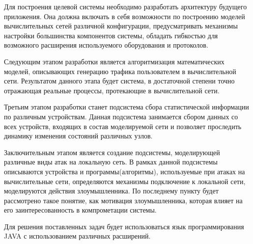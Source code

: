   Для построения целевой системы необходимо разработать архитектуру будущего приложения. Она должна включать в себя возможности по построению моделей вычислительных сетей различной конфигурации, предусматривать механизмы настройки большинства компонентов системы, обладать гибкостью для возможного расширения используемого оборудования и протоколов.

  Следующим этапом разработки является алгоритмизация математических моделей, описывающих генерацию трафика пользователем в вычислительной сети. Результатом данного этапа будет система, в достаточной степени точно отражающая реальные процессы, протекающие в вычислительной сети.

  Третьим этапом разработки станет подсистема сбора статистической информации по различным устройствам. Данная подсистема занимается сбором данных со всех устройств, входящих в состав моделируемой сети и позволяет проследить динамику изменения состояний различных узлов.

  Заключительным этапом является создание подсистемы, моделирующей различные виды атак на локальную сеть. В рамках данной подсистемы описываются устройства и программы(алгоритмы), используемые при атаках на вычислительные сети, определяются механизмы подключение к локальной сети, моделируются действия злоумышленника. По последнему пункту будет рассмотрено такое понятие, как мотивация злоумышленника, которая влияет на его заинтересованность в компрометации системы.

  Для решения поставленных задач будет использоваться язык программирования JAVA с использованием различных расширений.